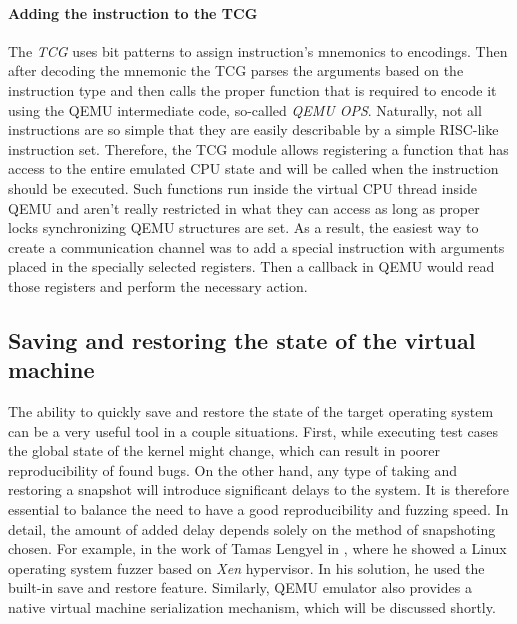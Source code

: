 \paragraph{Adding the instruction to the TCG}
The \textit{TCG} uses bit patterns to assign instruction's mnemonics to encodings. Then after decoding the mnemonic the TCG parses the arguments based on the instruction type and then calls the proper function that is required to encode it using the QEMU intermediate code, so-called \textit{QEMU OPS}. Naturally, not all instructions are so simple that they are easily describable by a simple RISC-like instruction set. Therefore, the TCG module allows registering a function that has access to the entire emulated CPU state and will be called when the instruction should be executed. Such functions run inside the virtual CPU thread inside QEMU and aren't really restricted in what they can access as long as proper locks synchronizing QEMU structures are set. As a result, the easiest way to create a communication channel was to add a special instruction with arguments placed in the specially selected registers. Then a callback in QEMU would read those registers and perform the necessary action.

\subsection{Saving and restoring the state of the virtual machine} \label{sec:savevm}
The ability to quickly save and restore the state of the target operating system can be a very useful tool in a couple situations. First, while executing test cases the global state of the kernel might change, which can result in poorer reproducibility of found bugs. On the other hand, any type of taking and restoring a snapshot will introduce significant delays to the system. It is therefore essential to balance the need to have a good reproducibility and fuzzing speed. In detail, the amount of added delay depends solely on the method of snapshoting chosen. For example, in the work of Tamas Lengyel in \cite{xenfuzz}, where he showed a Linux operating system fuzzer based on \textit{Xen} hypervisor. In his solution, he used the built-in save and restore feature. Similarly, QEMU emulator also provides a native virtual machine serialization mechanism, which will be discussed shortly.

